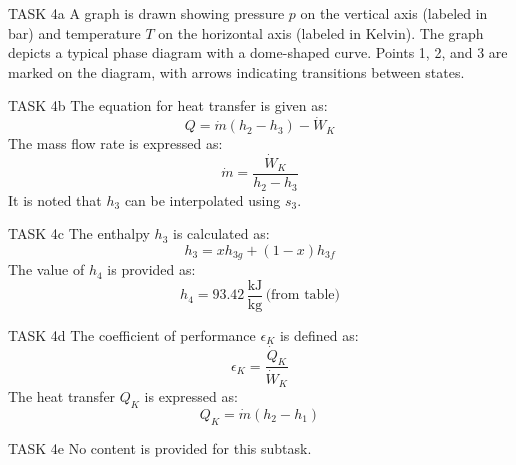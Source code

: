TASK 4a  
A graph is drawn showing pressure \( p \) on the vertical axis (labeled in bar) and temperature \( T \) on the horizontal axis (labeled in Kelvin). The graph depicts a typical phase diagram with a dome-shaped curve. Points 1, 2, and 3 are marked on the diagram, with arrows indicating transitions between states.  

TASK 4b  
The equation for heat transfer is given as:  
\[
Q = \dot{m} (h_2 - h_3) - \dot{W}_K
\]  
The mass flow rate is expressed as:  
\[
\dot{m} = \frac{\dot{W}_K}{h_2 - h_3}
\]  
It is noted that \( h_3 \) can be interpolated using \( s_3 \).  

TASK 4c  
The enthalpy \( h_3 \) is calculated as:  
\[
h_3 = x h_{3g} + (1 - x) h_{3f}
\]  
The value of \( h_4 \) is provided as:  
\[
h_4 = 93.42 \, \frac{\text{kJ}}{\text{kg}} \, \text{(from table)}
\]  

TASK 4d  
The coefficient of performance \( \epsilon_K \) is defined as:  
\[
\epsilon_K = \frac{\dot{Q}_K}{\dot{W}_K}
\]  
The heat transfer \( Q_K \) is expressed as:  
\[
Q_K = \dot{m} (h_2 - h_1)
\]  

TASK 4e  
No content is provided for this subtask.